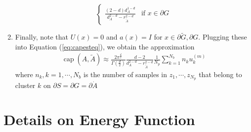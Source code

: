 \documentclass[english, aip, jcp, priprint, graphicx]{revtex4-1}
\theoremstyle{plain}
\theoremstyle{definition}
\theoremstyle{plain}
\begin{document}
\begin{enumerate}
\[\begin{cases}
	\frac{(2 - d) d_A^{1 - d}}{d_A^{2 - d} - r_{\tilde{A}}^{2 - d}} & \text{if }x \in \partial G
\end{cases}
\]
\item Finally, note that $U (x) = 0$ and $a (x) = I$ for $x
\in \partial \tilde{G},\partial G$.  Plugging these into Equation (\ref{eq:capesteq}), we obtain the approximation
%
\begin{gather}
	\ensuremath{\operatorname{cap}} (A, \tilde{A}) \approx \frac{2\pi^{\frac{d}{2}}}{\Gamma(\frac{d}{2})}\frac{d-2}{d_A^{2-d}-r_{\tilde A}^{2-d}}\frac{1}{N_p} \sum_{k=1}^{N_b}n_k u_k^{(m)}
\end{gather}
where $n_k, k=1, \cdots, N_b$ is the number of samples in $z_1, \cdots, z_{N_p}$ that belong to cluster $k$ on $\partial S=\partial G=\partial \dot{A}$
%
\end{enumerate}

\section{Details on Energy Function} \label{sec:energy_function}





\end{document}
